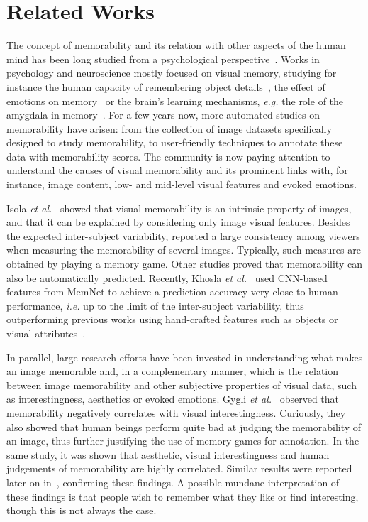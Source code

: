 \documentclass{sig-alternate-05-2015}
\begin{document}
\section{Related Works}
The concept of memorability and its relation with other aspects of the human mind has been long studied from a psychological perspective~\cite{maren1999long,anderson2006emotion,brady2008visual,hunt2006distinctiveness,phelps2004human,bradley1992remembering}. 
Works in psychology and neuroscience mostly focused on visual memory, studying for instance the human capacity of remembering object details~\cite{brady2008visual}, the effect of emotions on memory~\cite{anderson2006emotion,phelps2004human,bradley1992remembering} or the brain's learning mechanisms, \textit{e.g.} the role of the amygdala in memory~\cite{maren1999long,phelps2004human}.
For a few years now, more automated studies on memorability have arisen: from the collection of image datasets specifically designed to study memorability, to user-friendly techniques to annotate these data with memorability scores. The community is now paying attention to understand the causes of visual memorability and its prominent links with, for instance, image content, low- and mid-level visual features and evoked emotions.

Isola \textit{et al.}~\cite{isola2011what} showed that visual memorability is an intrinsic property of images, and that it can be explained by considering only image visual features. Besides the expected inter-subject variability, \cite{isola2011what} reported a large consistency among viewers when measuring the memorability of several images. Typically, such measures are obtained by playing a memory game. Other studies proved that memorability can also be automatically predicted. Recently, Khosla \textit{et al.}~\cite{khosla2015understanding} used CNN-based features from MemNet to achieve a prediction accuracy very close to human performance, \textit{i.e.} up to the limit of the inter-subject variability, thus outperforming previous works using hand-crafted features such as objects or visual attributes~\cite{isola2014what}. %

In parallel, large research efforts have been invested in understanding what makes an image memorable and, in a complementary manner, which is the relation between image memorability and other subjective properties of visual data, such as interestingness, aesthetics or evoked emotions. Gygli \textit{et al.}~\cite{gygli2013interestingness} observed that memorability negatively correlates with visual interestingness. Curiously, they also showed that human beings perform quite bad at judging the memorability of an image, thus further justifying the use of memory games for annotation. In the same study, it was shown that aesthetic, visual interestingness and human judgements of memorability are highly correlated. Similar results were reported later on in~\cite{isola2014what}, confirming these findings. A possible mundane interpretation of these findings is that people wish to remember what they like or find interesting, though this is not always the case.
\end{document}
